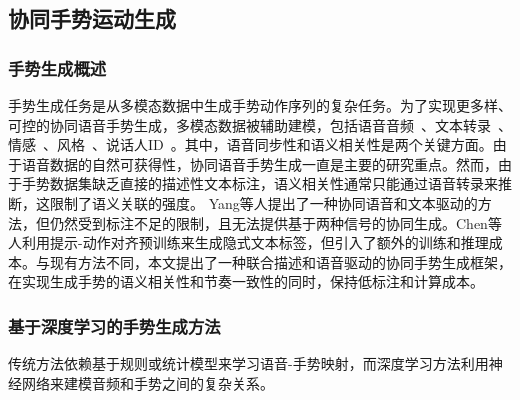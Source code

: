 


\subsection{协同手势运动生成}

\subsubsection{手势生成概述}
手势生成任务是从多模态数据中生成手势动作序列的复杂任务。为了实现更多样、可控的协同语音手势生成，多模态数据被辅助建模，包括语音音频~\cite{yang2023diffusestylegesture, yang2023unifiedgesture,xu2025mambatalk}、文本转录~\cite{zhi2023livelyspeaker, pang2023bodyformer,liu2024emage}、情感~\cite{qi2024emotiongesture, qi2024weakly}、风格~\cite{ao2023gesturediffuclip, yang2023diffusestylegesture, ghorbani2023zeroeggs}、说话人ID~\cite{yang2023diffusestylegesture+}。其中，语音同步性和语义相关性是两个关键方面。由于语音数据的自然可获得性，协同语音手势生成一直是主要的研究重点。然而，由于手势数据集缺乏直接的描述性文本标注，语义相关性通常只能通过语音转录来推断，这限制了语义关联的强度。
Yang等人\cite{yang2024freetalker}提出了一种协同语音和文本驱动的方法，但仍然受到标注不足的限制，且无法提供基于两种信号的协同生成。Chen等人\cite{chen2024syntalker}利用提示-动作对齐预训练来生成隐式文本标签，但引入了额外的训练和推理成本。与现有方法不同，本文提出了一种联合描述和语音驱动的协同手势生成框架，在实现生成手势的语义相关性和节奏一致性的同时，保持低标注和计算成本。

\subsubsection{基于深度学习的手势生成方法}
传统方法依赖基于规则或统计模型来学习语音-手势映射，而深度学习方法利用神经网络来建模音频和手势之间的复杂关系\cite{nyatsanga2023comprehensive}。

